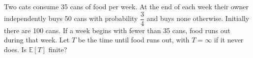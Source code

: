 Two cats consume 35 cans of food per week. At the end of each week their owner independently buys 50 cans with probability $\dfrac{3}{4}$ and buys none otherwise. Initially there are 100 cans. If a week begins with fewer than 35 cans, food runs out during that week. Let $T$ be the time until food runs out, with $T=\infty$ if it never does. Is $\mathbb E[T]$ finite?
